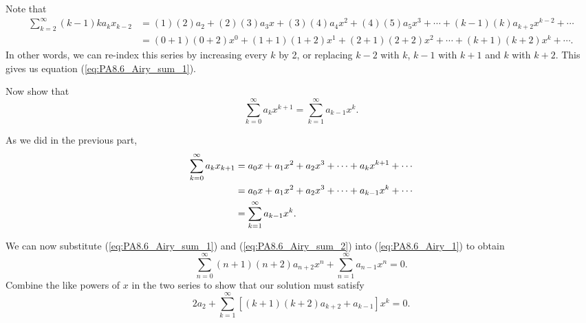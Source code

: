 \begin{exercises}
\begin{exerciseSolution}

Note that
\begin{align*}
\sum_{k=2}^{\infty} (k-1)ka_kx_{k-2} &= (1)(2)a_2 + (2)(3)a_3x + (3)(4)a_4x^2 + (4)(5)a_5x^3 + \cdots + (k-1)(k)a_{k+2}x^{k-2} + \cdots  \\
    &= (0+1)(0+2)x^0 + (1+1)(1+2)x^1 + (2+1)(2+2)x^2 + \cdots + (k+1)(k+2)x^k + \cdots.
\end{align*}
In other words, we can re-index this series by increasing every $k$ by 2, or replacing $k-2$ with $k$, $k-1$ with $k+1$ and $k$ with $k+2$. This gives us equation (\ref{eq:PA8.6_Airy_sum_1}).

\end{exerciseSolution}

    \item Now show that
\begin{equation} \label{eq:PA8.6_Airy_sum_2}
\sum_{k=0}^{\infty} a_kx^{k+1} = \sum_{k=1}^{\infty} a_{k-1}x^k.
\end{equation}

\begin{exerciseSolution}

As we did in the previous part,
\begin{align*}
\sum_{k=0}^{\infty} a_kx_{k+1} &= a_0x + a_1x^2 + a_2x^3 +  \cdots + a_kx^{k+1} + \cdots \notag \\
    &= a_0x + a_1x^2 + a_2x^3 +  \cdots + a_{k-1}x^{k} + \cdots \notag \\
    &= \sum_{k=1}^{\infty} a_{k-1}x^k.
\end{align*}

\end{exerciseSolution}

    \item We can now substitute (\ref{eq:PA8.6_Airy_sum_1}) and (\ref{eq:PA8.6_Airy_sum_2}) into (\ref{eq:PA8.6_Airy_1}) to obtain
\begin{equation} \label{eq:PA8.6_Airy_2}
\sum_{n=0}^{\infty} (n+1)(n+2)a_{n+2}x^{n} + \sum_{n=1}^{\infty} a_{n-1}x^{n} = 0.
\end{equation}
Combine the like powers of $x$ in the two series to show that our solution must satisfy
\begin{equation} \label{eq:PA8.6_Airy_sum_3}
2a_2 + \sum_{k=1}^{\infty} \left[(k+1)(k+2)a_{k+2}+a_{k-1} \right] x^{k} = 0.
\end{equation}

\begin{exerciseSolution}


\end{exerciseSolution}
\end{exercises}
